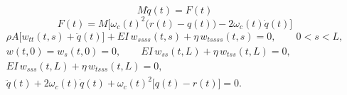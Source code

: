 \documentclass{article}
\begin{document}
\fontsize{12}{16}\selectfont
\vspace*{1mm}
\[
  M\ddot q(t)=F(t)
\]
\vspace{-4mm}
\[
  F(t)=M\bigl[\omega_c(t)^2\bigl(r(t)-q(t)\bigr)
                       -2\omega_c(t)\dot q(t)\bigr]
\]
\newpage
\fontsize{10}{12}\selectfont
\vspace*{-3mm}
\setlength{\jot}{2pt}
\[
\begin{gathered}
  \rho A\bigl[w_{tt}(t,s)+\ddot q(t)\bigr]
    +EI\,w_{ssss}(t,s)+\eta\,w_{tssss}(t,s)=0,
    \qquad 0<s<L,\\
  w(t,0)=w_s(t,0)=0,\qquad
  EI\,w_{ss}(t,L)+\eta\,w_{tss}(t,L)=0,\\
  EI\,w_{sss}(t,L)+\eta\,w_{tsss}(t,L)=0,\\
  \ddot q(t)+2\omega_c(t)\dot q(t)
    +\omega_c(t)^2\bigl[q(t)-r(t)\bigr]=0.
\end{gathered}
\]
\end{document}
